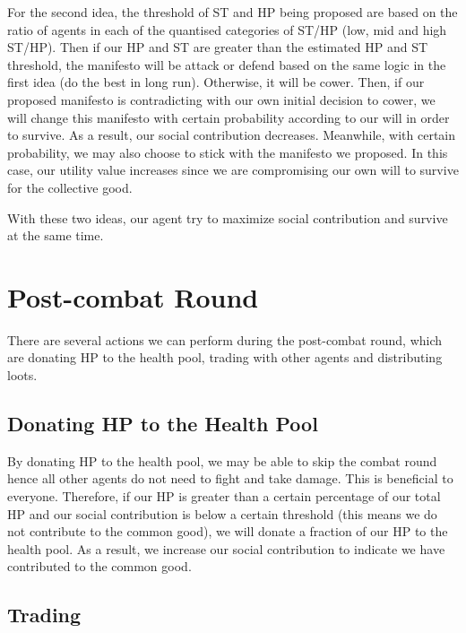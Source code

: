 \par For the second idea, the threshold of ST and HP being proposed are based on the ratio of agents in each of the quantised categories of ST/HP (low, mid and high ST/HP). Then if our HP and ST are greater than the estimated HP and ST threshold, the manifesto will be attack or defend based on the same logic in the first idea (do the best in long run). Otherwise, it will be cower. Then, if our proposed manifesto is contradicting with our own initial decision to cower, we will change this manifesto with certain probability according to our will in order to survive. As a result, our social contribution decreases. Meanwhile, with certain probability, we may also choose to stick with the manifesto we proposed. In this case, our utility value increases since we are compromising our own will to survive for the collective good.

\par With these two ideas, our agent try to maximize social contribution and survive at the same time.

\section{Post-combat Round}

\par There are several actions we can perform during the post-combat round, which are donating HP to the health pool, trading with other agents and distributing loots.

\subsection{Donating HP to the Health Pool}

\par By donating HP to the health pool, we may be able to skip the combat round hence all other agents do not need to fight and take damage. This is beneficial to everyone. Therefore, if our HP is greater than a certain percentage of our total HP and our social contribution is below a certain threshold (this means we do not contribute to the common good), we will donate a fraction of our HP to the health pool. As a result, we increase our social contribution to indicate we have contributed to the common good. 

\subsection{Trading}

